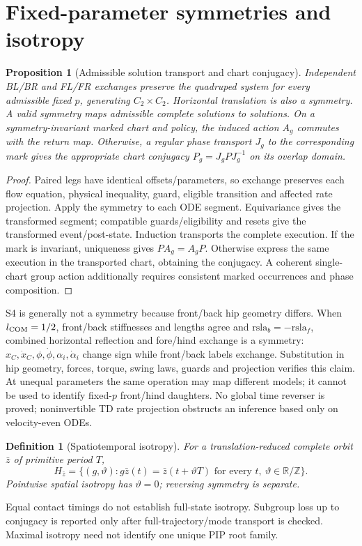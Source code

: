 \documentclass[11pt]{article}
\newtheorem{definition}{Definition}
\newtheorem{proposition}{Proposition}
\newcommand{\R}{\mathbb R}
\begin{document}
\section{Fixed-parameter symmetries and isotropy}
\begin{proposition}[Admissible solution transport and chart conjugacy]
Independent BL/BR and FL/FR exchanges preserve the quadruped system for every
admissible fixed $p$, generating $C_2\times C_2$. Horizontal translation is
also a symmetry. A valid symmetry maps admissible complete solutions to
solutions. On a symmetry-invariant marked chart and policy, the induced
action $A_g$ commutes with the return map. Otherwise, a regular phase
transport $J_g$ to the corresponding mark gives the appropriate chart
conjugacy $P_g=J_g P J_g^{-1}$ on its overlap domain.
\end{proposition}
\begin{proof}
Paired legs have identical offsets/parameters, so exchange preserves each
flow equation, physical inequality, guard, eligible transition and affected
rate projection. Apply the symmetry to each ODE segment. Equivariance gives
the transformed segment; compatible guards/eligibility and resets give the
transformed event/post-state. Induction transports the complete execution.
If the mark is invariant, uniqueness gives $P A_g=A_g P$. Otherwise express
the same execution in the transported chart, obtaining the conjugacy. A
coherent single-chart group action additionally requires consistent marked
occurrences and phase composition.
\end{proof}
S4 is generally not a symmetry because front/back hip geometry differs.
When $l_{\rm COM}=1/2$, front/back stiffnesses and lengths agree and
$\mathrm{rsla}_b=-\mathrm{rsla}_f$, combined horizontal reflection and
fore/hind exchange is a symmetry: $x_C,\dot x_C,\phi,\dot\phi,\alpha_i,
\dot\alpha_i$ change sign while front/back labels exchange. Substitution in
hip geometry, forces, torque, swing laws, guards and projection verifies this
claim. At unequal parameters the same operation may map different models;
it cannot be used to identify fixed-$p$ front/hind daughters. No global time
reverser is proved; noninvertible TD rate projection obstructs an inference
based only on velocity-even ODEs.

\begin{definition}[Spatiotemporal isotropy]
For a translation-reduced complete orbit $\bar z$ of primitive period $T$,
\[
H_{\bar z}=\{(g,\vartheta):g\bar z(t)=\bar z(t+\vartheta T)
\text{ for every }t,\ \vartheta\in\R/\mathbb Z\}.
\]
Pointwise spatial isotropy has $\vartheta=0$; reversing symmetry is separate.
\end{definition}
Equal contact timings do not establish full-state isotropy. Subgroup loss
up to conjugacy is reported only after full-trajectory/mode transport is
checked. Maximal isotropy need not identify one unique PIP root family.
\end{document}
